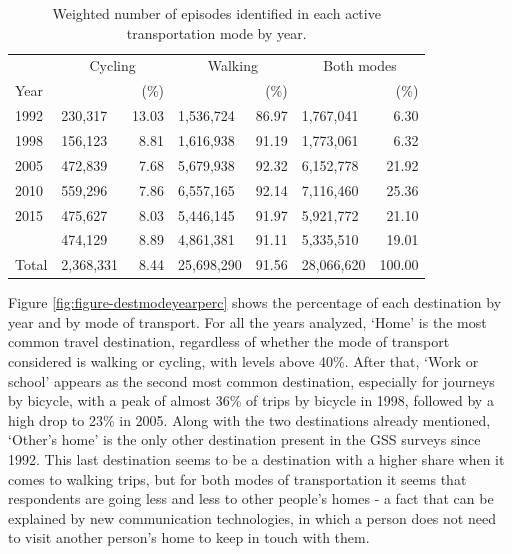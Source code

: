 \documentclass[preprint, 3p,
authoryear]{elsarticle} %
\begin{document}
\begin{table}
\centering
\caption{\label{tab:bulding table-01}\label{tab:episodes-count-percentages}Weighted number of episodes identified in each active transportation mode by year.}
\centering
\fontsize{10}{12}\selectfont
\begin{tabular}[t]{llrlrlr}
\toprule
\multicolumn{1}{c}{ } & \multicolumn{2}{c}{Cycling} & \multicolumn{2}{c}{Walking} & \multicolumn{2}{c}{Both modes} \\
\cmidrule(l{3pt}r{3pt}){2-3} \cmidrule(l{3pt}r{3pt}){4-5} \cmidrule(l{3pt}r{3pt}){6-7}
Year &  & (\%) &  & (\%) &  & (\%)\\
\midrule
1992 & 230,317 & 13.03 & 1,536,724 & 86.97 & 1,767,041 & 6.30\\
1998 & 156,123 & 8.81 & 1,616,938 & 91.19 & 1,773,061 & 6.32\\
2005 & 472,839 & 7.68 & 5,679,938 & 92.32 & 6,152,778 & 21.92\\
2010 & 559,296 & 7.86 & 6,557,165 & 92.14 & 7,116,460 & 25.36\\
2015 & 475,627 & 8.03 & 5,446,145 & 91.97 & 5,921,772 & 21.10\\
\addlinespace
2022 & 474,129 & 8.89 & 4,861,381 & 91.11 & 5,335,510 & 19.01\\
Total & 2,368,331 & 8.44 & 25,698,290 & 91.56 & 28,066,620 & 100.00\\
\bottomrule
\end{tabular}
\end{table}

Figure \ref{fig:figure-destmodeyearperc} shows the percentage of each
destination by year and by mode of transport. For all the years
analyzed, `Home' is the most common travel destination, regardless of
whether the mode of transport considered is walking or cycling, with
levels above 40\%. After that, `Work or school' appears as the second
most common destination, especially for journeys by bicycle, with a peak
of almost 36\% of trips by bicycle in 1998, followed by a high drop to
23\% in 2005. Along with the two destinations already mentioned,
`Other's home' is the only other destination present in the GSS surveys
since 1992. This last destination seems to be a destination with a
higher share when it comes to walking trips, but for both modes of
transportation it seems that respondents are going less and less to
other people's homes - a fact that can be explained by new communication
technologies, in which a person does not need to visit another person's
home to keep in touch with them.
\end{document}
